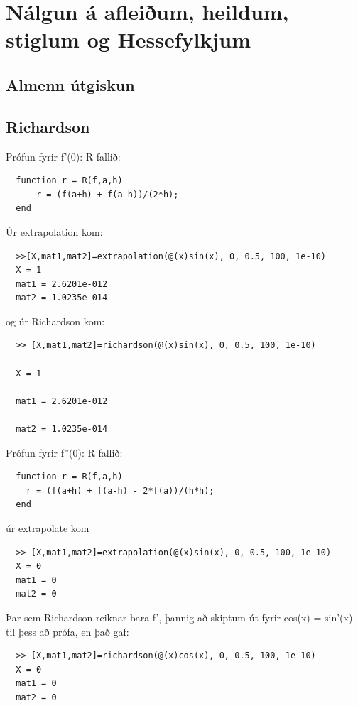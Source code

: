 \documentclass[a4]{article}
\begin{document}
\section{Nálgun á afleiðum, heildum, stiglum og Hessefylkjum}
\subsection{Almenn útgiskun}


\subsection{Richardson}
Prófun fyrir f'(0):
R fallið:
\begin{lstlisting}
  function r = R(f,a,h)
      r = (f(a+h) + f(a-h))/(2*h);
  end
\end{lstlisting}

Úr extrapolation kom:
\begin{lstlisting}
  >>[X,mat1,mat2]=extrapolation(@(x)sin(x), 0, 0.5, 100, 1e-10)
  X = 1 
  mat1 = 2.6201e-012
  mat2 = 1.0235e-014 
\end{lstlisting}

og úr Richardson kom:
\begin{lstlisting}
  >> [X,mat1,mat2]=richardson(@(x)sin(x), 0, 0.5, 100, 1e-10)

  X = 1

  mat1 = 2.6201e-012

  mat2 = 1.0235e-014
\end{lstlisting}
Prófun fyrir f''(0):
R fallið:
\begin{lstlisting}
  function r = R(f,a,h)
    r = (f(a+h) + f(a-h) - 2*f(a))/(h*h);
  end
\end{lstlisting}

úr extrapolate kom
\begin{lstlisting}
  >> [X,mat1,mat2]=extrapolation(@(x)sin(x), 0, 0.5, 100, 1e-10)
  X = 0
  mat1 = 0
  mat2 = 0
\end{lstlisting}

Þar sem Richardson reiknar bara f', þannig að skiptum út fyrir cos(x) = sin'(x) til þess að prófa, en það gaf:
\begin{lstlisting}
  >> [X,mat1,mat2]=richardson(@(x)cos(x), 0, 0.5, 100, 1e-10)
  X = 0
  mat1 = 0
  mat2 = 0
\end{lstlisting}
\end{document}
